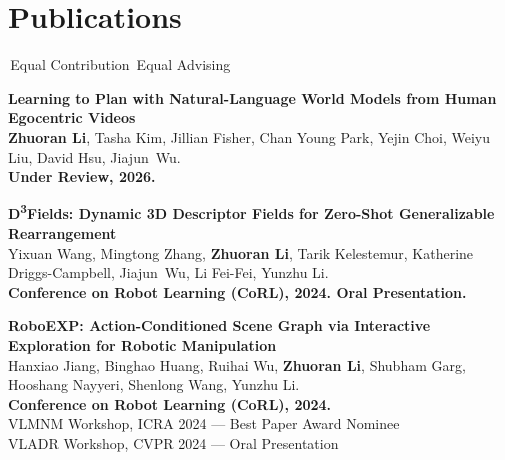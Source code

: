 \section{Publications}
{\small \equalwork\,Equal Contribution \qquad \equaladvice\,Equal Advising}\par
\begin{enumerate}[label={[\arabic*]},font=\bfseries,leftmargin=*,align=left,labelsep=.55em,topsep=5pt,itemsep=8pt,parsep=0pt]
  \item
    \textbf{Learning to Plan with Natural-Language World Models from Human Egocentric Videos}\\
    \textbf{Zhuoran Li}, Tasha Kim, Jillian Fisher, Chan Young Park, Yejin Choi, Weiyu Liu\equaladvice, David Hsu\equaladvice, Jiajun~Wu\equaladvice.\\
    \textbf{Under Review, 2026.}
  \item
    \textbf{D\textsuperscript{3}Fields: Dynamic 3D Descriptor Fields for Zero-Shot Generalizable Rearrangement}\\
    Yixuan Wang\equalwork, Mingtong Zhang\equalwork, \textbf{Zhuoran Li}\equalwork, Tarik Kelestemur, Katherine Driggs-Campbell, Jiajun~Wu, Li Fei-Fei, Yunzhu Li.\\
    \textbf{Conference on Robot Learning (CoRL), 2024. Oral Presentation.}
  \item
    \textbf{RoboEXP: Action-Conditioned Scene Graph via Interactive Exploration for Robotic Manipulation}\\
    Hanxiao Jiang, Binghao Huang, Ruihai Wu, \textbf{Zhuoran Li}, Shubham Garg, Hooshang Nayyeri, Shenlong Wang, Yunzhu Li.\\
    \textbf{Conference on Robot Learning (CoRL), 2024.}\\
    VLMNM Workshop, ICRA 2024 --- Best Paper Award Nominee\\
    VLADR Workshop, CVPR 2024 --- Oral Presentation
\end{enumerate}
